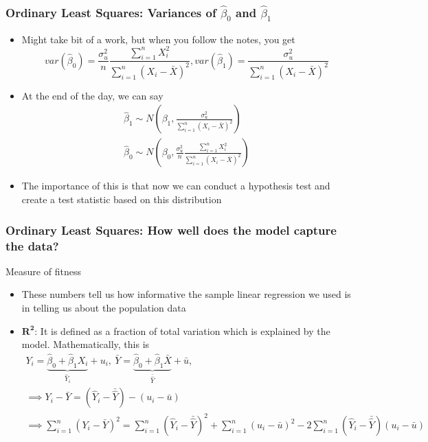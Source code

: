 \documentclass[aspectratio=169]{beamer}
\begin{document}
\begin{frame}
\frametitle{Ordinary Least Squares: Variances of $\hat{\beta}_0$ and $\hat{\beta}_1$}
\begin{itemize}
\item Might take bit of a work, but when you follow the notes, you get
\[
var(\hat{\beta}_0)= \frac{\sigma_u^2}{n}\frac{\sum_{i=1}^nX_i^2}{\sum_{i=1}^n(X_i-\bar{X})^2}, var(\hat{\beta}_1)=\frac{\sigma_u^2}{\sum_{i=1}^n(X_i-\bar{X})^2}
\]
\item At the end of the day, we can say
\begin{gather*}
 \hat{\beta}_1 \sim N\left(\beta_1, \frac{\sigma_u^2}{\sum_{i=1}^n(X_i-\bar{X})^2}\right) \\
\hat{\beta}_0 \sim N\left(\beta_0, \frac{\sigma_u^2}{n}\frac{\sum_{i=1}^nX_i^2}{\sum_{i=1}^n(X_i-\bar{X})^2}\right)
\end{gather*}
\item The importance of this is that now we can conduct a hypothesis test and create a test statistic based on this distribution
\end{itemize}
\end{frame}

\begin{frame}
\frametitle{Ordinary Least Squares: How well does the model capture the data?}
Measure of fitness
\begin{itemize}
\item These numbers tell us how informative the sample linear regression we used is in telling us about the population data
\item $\mathbf{R^2}$: It is defined as a fraction of total variation which is explained by the model. Mathematically, this is
\footnotesize{%
\begin{gather*} 
Y_i = \underbrace{\hat{\beta}_0 + \hat{\beta}_1X_i}_{\hat{Y}_i} + u_i, \ \bar{Y} = \underbrace{\hat{\beta}_0 + \hat{\beta}_1\bar{X}}_{\bar{\hat{Y}}} + \bar{u}, \\
\implies Y_i-\bar{Y} = (\hat{Y}_i - \bar{\hat{Y}}) - (u_i - \bar{u}) \\
\implies \sum_{i=1}^n (Y_i-\bar{Y})^2= \sum_{i=1}^n (\hat{Y}_i - \bar{\hat{Y}})^2+\sum_{i=1}^n(u_i - \bar{u})^2 - 2\sum_{i=1}^n(\hat{Y}_i - \bar{\hat{Y}}) (u_i - \bar{u})
\end{gather*}}\normalsize
\end{itemize}
\end{frame}
\end{document}
